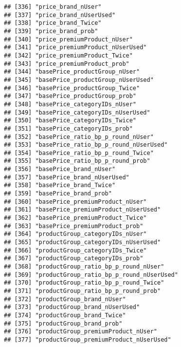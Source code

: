 \documentclass[10pt]{report}
\begin{document}
\begin{verbatim}
## [336] "price_brand_nUser"                                  
## [337] "price_brand_nUserUsed"                              
## [338] "price_brand_Twice"                                  
## [339] "price_brand_prob"                                   
## [340] "price_premiumProduct_nUser"                         
## [341] "price_premiumProduct_nUserUsed"                     
## [342] "price_premiumProduct_Twice"                         
## [343] "price_premiumProduct_prob"                          
## [344] "basePrice_productGroup_nUser"                       
## [345] "basePrice_productGroup_nUserUsed"                   
## [346] "basePrice_productGroup_Twice"                       
## [347] "basePrice_productGroup_prob"                        
## [348] "basePrice_categoryIDs_nUser"                        
## [349] "basePrice_categoryIDs_nUserUsed"                    
## [350] "basePrice_categoryIDs_Twice"                        
## [351] "basePrice_categoryIDs_prob"                         
## [352] "basePrice_ratio_bp_p_round_nUser"                   
## [353] "basePrice_ratio_bp_p_round_nUserUsed"               
## [354] "basePrice_ratio_bp_p_round_Twice"                   
## [355] "basePrice_ratio_bp_p_round_prob"                    
## [356] "basePrice_brand_nUser"                              
## [357] "basePrice_brand_nUserUsed"                          
## [358] "basePrice_brand_Twice"                              
## [359] "basePrice_brand_prob"                               
## [360] "basePrice_premiumProduct_nUser"                     
## [361] "basePrice_premiumProduct_nUserUsed"                 
## [362] "basePrice_premiumProduct_Twice"                     
## [363] "basePrice_premiumProduct_prob"                      
## [364] "productGroup_categoryIDs_nUser"                     
## [365] "productGroup_categoryIDs_nUserUsed"                 
## [366] "productGroup_categoryIDs_Twice"                     
## [367] "productGroup_categoryIDs_prob"                      
## [368] "productGroup_ratio_bp_p_round_nUser"                
## [369] "productGroup_ratio_bp_p_round_nUserUsed"            
## [370] "productGroup_ratio_bp_p_round_Twice"                
## [371] "productGroup_ratio_bp_p_round_prob"                 
## [372] "productGroup_brand_nUser"                           
## [373] "productGroup_brand_nUserUsed"                       
## [374] "productGroup_brand_Twice"                           
## [375] "productGroup_brand_prob"                            
## [376] "productGroup_premiumProduct_nUser"                  
## [377] "productGroup_premiumProduct_nUserUsed"              

\end{verbatim}
\end{document}
